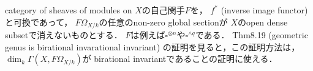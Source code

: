 \documentclass[a4paper]{jsarticle}
\newcommand{\Der}{\Omega}
\begin{document}
    category of sheaves of modules on $X$の自己関手$F$を，
    $f^*$ (inverse image functor)と可換であって，
    $F \Der_{X/k}$の任意のnon-zero global sectionが
    $X$のopen dense subsetで消えないものとする．
    $F$は例えば$\square^{\otimes n}$や$\square^{\wedge q}$である．
    Thm8.19 (geometric genus is birational invarational invariant)
    の証明を見ると，この証明方法は，
    $\dim_k \Gamma(X, F \Der_{X/k})$が
    birational invariantであることの証明に使える．
\end{document}
